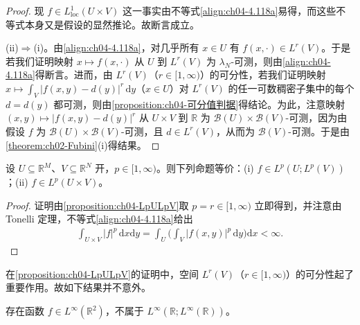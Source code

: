 \documentclass[../../main.tex]{subfiles}%
\begin{document}
\begin{proof}
现 $f\in L^1_{\mathrm{loc}}(U\times V)$ 这一事实由不等式\eqref{align:ch04-4.118a}易得，而这些不等式本身又是假设的显然推论。故断言成立。

(ii)$\Rightarrow$(i)。由\eqref{align:ch04-4.118a}，对几乎所有 $x\in U$ 有 $f(x,\cdot)\in L^r(V)$。于是若我们证明映射 $x\mapsto f(x,\cdot)$ 从 $U$ 到 $L^r(V)$ 为 $\lambda_N$-可测，则由\eqref{align:ch04-4.118a}得断言。进而，由 $L^r(V)$（$r\in[1,\infty)$）的可分性，若我们证明映射 $x\mapsto\int_V|f(x,y)-d(y)|^r\,\mathrm{d}y$（$x\in U$）对 $L^r(V)$ 的任一可数稠密子集中的每个 $d=d(y)$ 都可测，则由\cref{proposition:ch04-可分值判据}得结论。为此，注意映射 $(x,y)\mapsto|f(x,y)-d(y)|^r$ 从 $U\times V$ 到 $\mathbb{R}$ 为 $\mathcal{B}(U)\times\mathcal{B}(V)$-可测，因为由假设 $f$ 为 $\mathcal{B}(U)\times\mathcal{B}(V)$-可测，且 $d\in L^r(V)$，从而为 $\mathcal{B}(V)$-可测。于是由\cref{theorem:ch02-Fubini}(i)得结果。
\end{proof}

\begin{corollary}\label{corollary:ch04-Lp乘积}
设 $U\subseteq\mathbb{R}^M$、$V\subseteq\mathbb{R}^N$ 开，$p\in[1,\infty)$。则下列命题等价：(i) $f\in L^p(U;L^p(V))$；(ii) $f\in L^p(U\times V)$。
\end{corollary}

\begin{proof}
证明由\cref{proposition:ch04-LpULpV}取 $p=r\in[1,\infty)$ 立即得到，并注意由 Tonelli 定理，不等式\eqref{align:ch04-4.118a}给出
\begin{align*}
\int_{U\times V}|f|^p\,\mathrm{d}x\mathrm{d}y=\int_U\Big(\int_V|f(x,y)|^p\,\mathrm{d}y\Big)\mathrm{d}x<\infty.
\end{align*}
\end{proof}

在\cref{proposition:ch04-LpULpV}的证明中，空间 $L^r(V)$（$r\in[1,\infty)$）的可分性起了重要作用。故如下结果并不意外。

\begin{proposition}\label{proposition:ch04-L无穷不可交换}
存在函数 $f\in L^\infty(\mathbb{R}^2)$，不属于 $L^\infty(\mathbb{R};L^\infty(\mathbb{R}))$。
\end{proposition}
\end{document}
